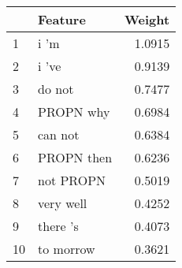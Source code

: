 \begin{tabular}{llr}
\toprule
{} &     Feature &  Weight \\
\midrule
1  &        i 'm &  1.0915 \\
2  &       i 've &  0.9139 \\
3  &      do not &  0.7477 \\
4  &   PROPN why &  0.6984 \\
5  &     can not &  0.6384 \\
6  &  PROPN then &  0.6236 \\
7  &   not PROPN &  0.5019 \\
8  &   very well &  0.4252 \\
9  &    there 's &  0.4073 \\
10 &   to morrow &  0.3621 \\
\bottomrule
\end{tabular}
